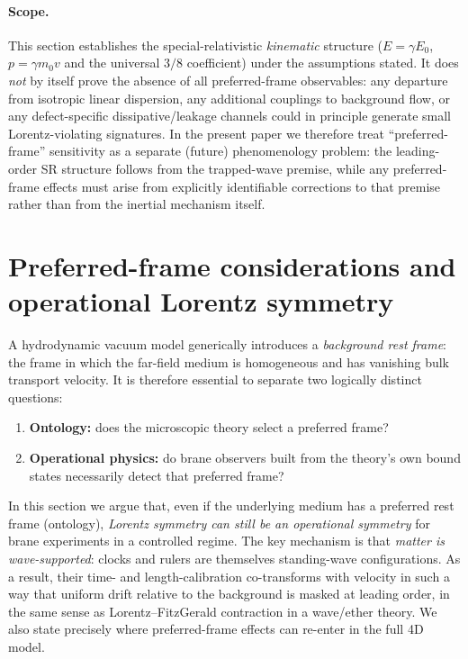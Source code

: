 \documentclass[11pt]{article}
\begin{document}
\paragraph{Scope.}
This section establishes the special-relativistic \emph{kinematic} structure ($E=\gamma E_0$, $p=\gamma m_0 v$ and the universal $3/8$ coefficient) under the assumptions stated. It does \emph{not} by itself prove the absence of all preferred-frame observables: any departure from isotropic linear dispersion, any additional couplings to background flow, or any defect-specific dissipative/leakage channels could in principle generate small Lorentz-violating signatures. In the present paper we therefore treat ``preferred-frame'' sensitivity as a separate (future) phenomenology problem: the leading-order SR structure follows from the trapped-wave premise, while any preferred-frame effects must arise from explicitly identifiable corrections to that premise rather than from the inertial mechanism itself.

\section{Preferred-frame considerations and operational Lorentz symmetry}
\label{sec:preferred_frame}

A hydrodynamic vacuum model generically introduces a \emph{background rest frame}:
the frame in which the far-field medium is homogeneous and has vanishing bulk
transport velocity. It is therefore essential to separate two logically distinct
questions:

\begin{enumerate}
\item \textbf{Ontology:} does the microscopic theory select a preferred frame?
\item \textbf{Operational physics:} do brane observers built from the theory's
      own bound states necessarily detect that preferred frame?
\end{enumerate}

In this section we argue that, even if the underlying medium has a preferred
rest frame (ontology), \emph{Lorentz symmetry can still be an operational symmetry}
for brane experiments in a controlled regime. The key mechanism is that
\emph{matter is wave-supported}: clocks and rulers are themselves standing-wave
configurations. As a result, their time- and length-calibration co-transforms
with velocity in such a way that uniform drift relative to the background is
masked at leading order, in the same sense as Lorentz--FitzGerald contraction in
a wave/ether theory. We also state precisely where preferred-frame effects can
re-enter in the full 4D model.
\end{document}
